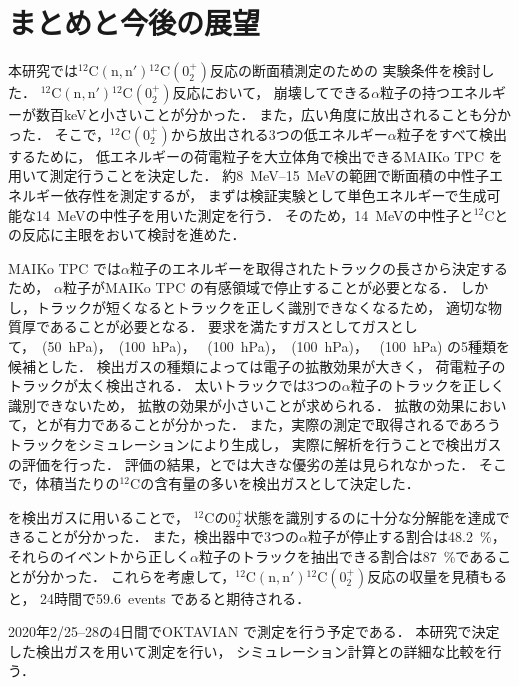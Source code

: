 \documentclass[../master]{subfiles}
\begin{document}
\chapter{まとめと今後の展望}
本研究では${}^{12}\mathrm{C}(\mathrm{n}, \mathrm{n}'){}^{12}\mathrm{C} (0_2^+)$反応の断面積測定のための
実験条件を検討した．
${}^{12}\mathrm{C}(\mathrm{n}, \mathrm{n}'){}^{12}\mathrm{C} (0_2^+)$反応において，
崩壊してできる$\alpha$粒子の持つエネルギーが数百\si{\kilo\electronvolt}と小さいことが分かった．
また，広い角度に放出されることも分かった．
そこで，${}^{12}\mathrm{C} (0_2^+)$から放出される3つの低エネルギー$\alpha$粒子をすべて検出するために，
低エネルギーの荷電粒子を大立体角で検出できるMAIKo TPC を用いて測定行うことを決定した．
約\SIrange{8}{15}{\mega\electronvolt}の範囲で断面積の中性子エネルギー依存性を測定するが，
まずは検証実験として単色エネルギーで生成可能な\SI{14}{\mega\electronvolt}の中性子を用いた測定を行う．
そのため，\SI{14}{\mega\electronvolt}の中性子と${}^{12}\mathrm{C}$との反応に主眼をおいて検討を進めた．

MAIKo TPC では$\alpha$粒子のエネルギーを取得されたトラックの長さから決定するため，
$\alpha$粒子がMAIKo TPC の有感領域で停止することが必要となる．
しかし，トラックが短くなるとトラックを正しく識別できなくなるため，
適切な物質厚であることが必要となる．
要求を満たすガスとしてガスとして，\Methane~(\SI{50}{\hecto\pascal})，\MethaneHydro~(\SI{100}{\hecto\pascal})，
\MethaneHerium~(\SI{100}{\hecto\pascal})，\isoButaneHydro~(\SI{100}{\hecto\pascal})，
\isoButaneHerium~(\SI{100}{\hecto\pascal}) の5種類を候補とした．
検出ガスの種類によっては電子の拡散効果が大きく，
荷電粒子のトラックが太く検出される．
太いトラックでは3つの$\alpha$粒子のトラックを正しく識別できないため，
拡散の効果が小さいことが求められる．
拡散の効果において，\MethaneHydro と\isoButaneHydro が有力であることが分かった．
また，実際の測定で取得されるであろうトラックをシミュレーションにより生成し，
実際に解析を行うことで検出ガスの評価を行った．
評価の結果，\MethaneHydro と\isoButaneHydro では大きな優劣の差は見られなかった．
そこで，体積当たりの${}^{12}\mathrm{C}$の含有量の多い\isoButaneHydro を検出ガスとして決定した．

\isoButaneHydro を検出ガスに用いることで，
${}^{12}\mathrm{C}$の$0_2^+$状態を識別するのに十分な分解能を達成できることが分かった．
また，検出器中で3つの$\alpha$粒子が停止する割合は\SI{48.2}{\percent}，
それらのイベントから正しく$\alpha$粒子のトラックを抽出できる割合は\SI{87}{\percent}であることが分かった．
これらを考慮して，${}^{12}\mathrm{C}(\mathrm{n}, \mathrm{n}'){}^{12}\mathrm{C} (0_2^+)$反応の収量を見積もると，
24時間で59.6~events であると期待される．

2020年2/25--28の4日間でOKTAVIAN で測定を行う予定である．
本研究で決定した検出ガスを用いて測定を行い，
シミュレーション計算との詳細な比較を行う．
\end{document}
